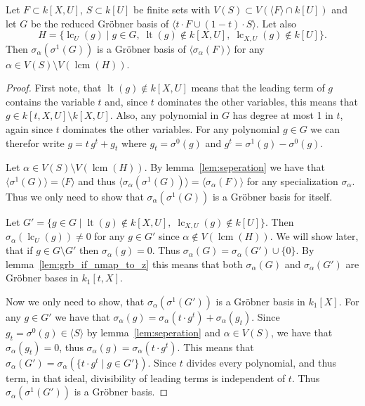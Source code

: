 \documentclass[a4paper, 12pt]{article}
\DeclareMathOperator{\LT}{lt}
\DeclareMathOperator{\LC}{lc}
\DeclareMathOperator{\lcm}{lcm}
\theoremstyle{changedot}
\theoremstyle{changedotbreak}
\theoremstyle{nonumberplain}
\newtheorem{proof}{Proof}
\begin{document}
\begin{lemma}\label{lem:grb_if_nmap_to_z_t}
  Let $F \subset k[X, U]$, $S \subset k[U]$ be finite sets with $V(S) \subset V(\langle F \rangle \cap k[U])$ and let $G$ be the reduced Gröbner basis of $\langle t\cdot F \cup (1-t)\cdot S \rangle$. Let also \[H = \{\LC_{U}(g) \mid g \in G,\; \LT(g) \notin k[X, U],\; \LC_{X, U}(g) \notin k[U]\}.\] Then $\sigma_{\alpha}(\sigma^{1}(G))$ is a Gröbner basis of $\langle \sigma_{\alpha}(F) \rangle$ for any $\alpha \in V(S) \setminus V(\lcm(H))$.
\end{lemma}
\begin{proof}
  First note, that $\LT(g) \notin k[X, U]$ means that the leading term of $g$ contains the variable $t$ and, since $t$ dominates the other variables, this means that $g \in k[t, X, U] \setminus k[X, U]$. Also, any polynomial in $G$ has degree at most 1 in $t$, again since $t$ dominates the other variables. For any polynomial $g \in G$ we can therefor write $g = t\,g^{t} + g_{t}$ where $g_{t} = \sigma^{0}(g)$ and $g^{t} = \sigma^{1}(g) - \sigma^{0}(g)$.

  Let $\alpha \in V(S) \setminus V(\lcm(H))$. By lemma~\ref{lem:seperation} we have that $\langle \sigma^{1}(G) \rangle = \langle F \rangle$ and thus $\langle \sigma_{\alpha}(\sigma^{1}(G)) \rangle = \langle \sigma_{\alpha}(F) \rangle$ for any specialization $\sigma_{\alpha}$. Thus we only need to show that $\sigma_{\alpha}(\sigma^{1}(G))$ is a Gröbner basis for itself.

  Let $G' = \{g \in G \mid \LT(g) \notin k[X, U],\; \LC_{X, U}(g) \notin k[U]\}$. Then $\sigma_{\alpha}(\LC_{U}(g)) \neq 0$ for any $g \in G'$ since $\alpha \notin V(\lcm(H))$. We will show later, that if $g \in G \setminus G'$ then $\sigma_{\alpha}(g) = 0$. Thus $\sigma_{\alpha}(G) = \sigma_{\alpha}(G') \cup \{0\}$. By lemma~\ref{lem:grb_if_nmap_to_z} this means that both $\sigma_{\alpha}(G)$ and $\sigma_{\alpha}(G')$ are Gröbner bases in $k_{1}[t, X]$.

  Now we only need to show, that $\sigma_{\alpha}(\sigma^{1}(G'))$ is a Gröbner basis in $k_{1}[X]$. For any $g \in G'$ we have that $\sigma_{\alpha}(g) = \sigma_{\alpha}(t\cdot g^{t}) + \sigma_{\alpha}(g_{t})$. Since $g_{t} = \sigma^{0}(g) \in \langle S \rangle$ by lemma~\ref{lem:seperation} and $\alpha \in V(S)$, we have that $\sigma_{\alpha}(g_{t}) = 0$, thus $\sigma_{\alpha}(g) = \sigma_{\alpha}(t \cdot g^{t})$. This means that $\sigma_{\alpha}(G') = \sigma_{\alpha}(\{t \cdot g^{t} \mid g \in G'\})$. Since $t$ divides every polynomial, and thus term, in that ideal, divisibility of leading terms is independent of $t$. Thus $\sigma_{\alpha}(\sigma^{1}(G'))$ is a Gröbner basis.


\end{proof}
\end{document}
